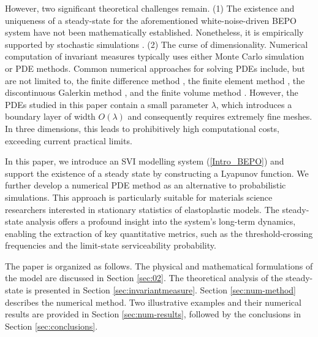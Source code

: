 \documentclass[12pt]{article}
\numberwithin{equation}{section}
\begin{document}
However, two significant theoretical challenges remain. 
(1) The existence and uniqueness of a steady-state for the aforementioned 
white-noise-driven BEPO system have not been mathematically established.
Nonetheless, it is empirically supported by stochastic simulations \cite{ip2025control}. 
(2) The curse of dimensionality. 
Numerical computation of invariant measures typically uses either Monte Carlo simulation or PDE methods. 
Common numerical approaches for solving PDEs include, 
but are not limited to, 
the finite difference method \cite{lauriere2019free,MSW19,zhong2024analysis}, 
the finite element method \cite{BMPT09,mertz2019numerical,qiu2020note,gao2021pointwise}, 
the discontinuous Galerkin method \cite{li2022convergent}, 
and the finite volume method \cite{wu2023unconditionally}. 
However, the PDEs studied in this paper contain a small parameter $\lambda$, 
which introduces a boundary layer of width $O(\lambda)$ and consequently requires extremely fine meshes. 
In three dimensions, this leads to prohibitively high computational costs, 
exceeding current practical limits. 


In this paper, 
we introduce an SVI modelling system (\ref{Intro_BEPO}) and 
support the existence of a steady state by constructing a Lyapunov function. 
We further develop a numerical PDE method as an alternative to probabilistic simulations. 
This approach is particularly suitable for materials science researchers interested in stationary statistics of elastoplastic models. 
The steady-state analysis offers a profound insight into the system's long-term dynamics, 
enabling the extraction of key quantitative metrics, 
such as the threshold-crossing frequencies and 
the limit-state serviceability probability.


The paper is organized as follows. 
The physical and mathematical formulations of the model are discussed in Section \ref{sec:02}. 
The theoretical analysis of the steady-state is presented in Section \ref{sec:invariantmeasure}. 
Section \ref{sec:num-method} describes the numerical method. 
Two illustrative examples and their numerical results are provided in  Section \ref{sec:num-results}, 
followed by the conclusions in Section \ref{sec:conclusions}.
\end{document}

